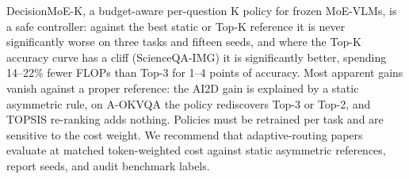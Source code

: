 DecisionMoE-K, a budget-aware per-question K policy for frozen MoE-VLMs, is a safe controller: against the best static or Top-K reference it is never significantly worse on three tasks and fifteen seeds, and where the Top-K accuracy curve has a cliff (ScienceQA-IMG) it is significantly better, spending 14--22\% fewer FLOPs than Top-3 for 1--4 points of accuracy. Most apparent gains vanish against a proper reference: the AI2D gain is explained by a static asymmetric rule, on A-OKVQA the policy rediscovers Top-3 or Top-2, and TOPSIS re-ranking adds nothing. Policies must be retrained per task and are sensitive to the cost weight. We recommend that adaptive-routing papers evaluate at matched token-weighted cost against static asymmetric references, report seeds, and audit benchmark labels.

